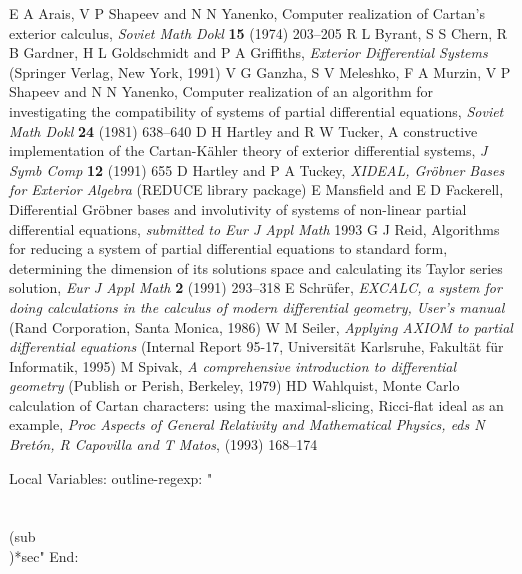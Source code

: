 \newpage
\begin{thebibliography}{00}

	E A Arais, V P Shapeev and N N Yanenko,
	Computer realization of Cartan's exterior calculus, 
	{\em Soviet Math Dokl} {\bf 15} (1974) 203--205
	R L Byrant, S S Chern, R B Gardner, H L Goldschmidt and
	P A Griffiths, {\em
	Exterior Differential Systems}
	(Springer Verlag, New York, 1991)
	V G Ganzha, S V Meleshko, F A Murzin, V P Shapeev and
	N N Yanenko,
	Computer realization of an algorithm for investigating the
	compatibility of systems of partial differential equations,
	{\em Soviet Math Dokl} {\bf 24} (1981) 638--640
	D H Hartley and R W Tucker,
	A constructive implementation of the Cartan-K{\"a}hler theory of
	exterior differential systems,
	{\em J Symb Comp} {\bf12} (1991) 655
	D Hartley and P A Tuckey, {\em
	XIDEAL, Gr{\"o}bner Bases for Exterior Algebra}
	(REDUCE library package)
	E Mansfield and E D Fackerell,
	Differential Gr{\"o}bner bases and involutivity of systems of
	non-linear partial differential equations,
	{\em submitted to Eur J Appl Math} 1993
	G J Reid,
	Algorithms for reducing a system of partial differential equations
	to standard form, determining the dimension of its solutions space
	and calculating its Taylor series solution,
	{\em Eur J Appl Math} {\bf 2} (1991) 293--318
	E Schr{\"u}fer, {\em
	EXCALC, a system for doing calculations in the calculus of modern
	differential geometry, User's manual}
	(Rand Corporation, Santa Monica, 1986)
	W M Seiler, {\em
	Applying AXIOM to partial differential equations}
	(Internal Report 95-17, Universit{\"a}t Karlsruhe, Fakult{\"a}t f{\"u}r
	Informatik, 1995)
	M Spivak, {\em
	A comprehensive introduction to differential geometry}
	(Publish or Perish, Berkeley, 1979)
	HD Wahlquist,
	Monte Carlo calculation of Cartan characters: using the
	maximal-slicing, Ricci-flat ideal as an example,
	{\em Proc Aspects of General Relativity and Mathematical Physics,
	eds N Bret{\'o}n, R Capovilla and
	T Matos}, (1993) 168--174
\end{thebibliography}



Local Variables:
outline-regexp: "\\\\\\(sub\\)*sec"
End:
